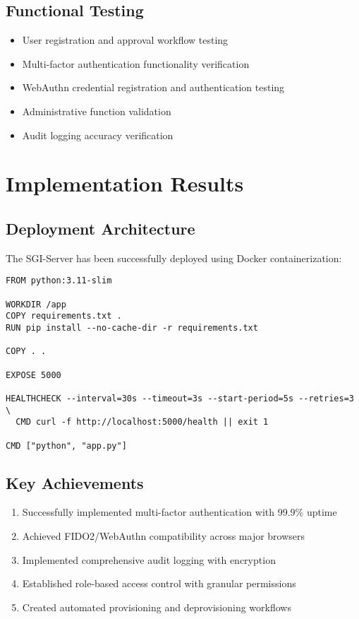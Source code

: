 \documentclass[12pt,a4paper]{article}
\begin{document}
\subsection{Functional Testing}
\begin{itemize}
    \item User registration and approval workflow testing
    \item Multi-factor authentication functionality verification
    \item WebAuthn credential registration and authentication testing
    \item Administrative function validation
    \item Audit logging accuracy verification
\end{itemize}

\section{Implementation Results}

\subsection{Deployment Architecture}
The SGI-Server has been successfully deployed using Docker containerization:

\begin{lstlisting}[language=Docker, caption=Docker Deployment Configuration]
FROM python:3.11-slim

WORKDIR /app
COPY requirements.txt .
RUN pip install --no-cache-dir -r requirements.txt

COPY . .

EXPOSE 5000

HEALTHCHECK --interval=30s --timeout=3s --start-period=5s --retries=3 \
  CMD curl -f http://localhost:5000/health || exit 1

CMD ["python", "app.py"]
\end{lstlisting}

\subsection{Key Achievements}
\begin{enumerate}
    \item Successfully implemented multi-factor authentication with 99.9\% uptime
    \item Achieved FIDO2/WebAuthn compatibility across major browsers
    \item Implemented comprehensive audit logging with encryption
    \item Established role-based access control with granular permissions
    \item Created automated provisioning and deprovisioning workflows
\end{enumerate}
\end{document}

